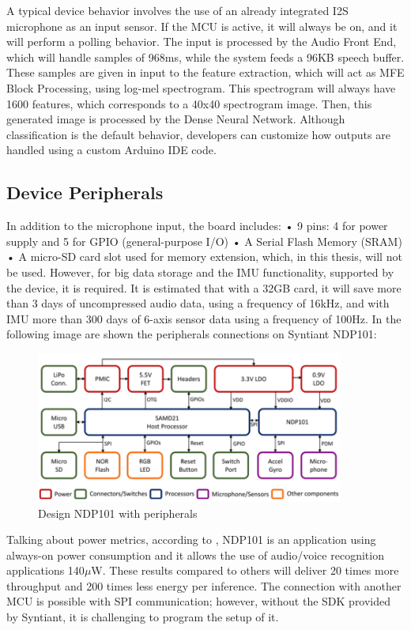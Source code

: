\newline A typical device behavior involves the use of an already integrated I2S microphone as an input sensor. If the MCU is active, it will always be on, and it will perform a polling behavior. The input is processed by the Audio Front End, which will handle samples of 968ms, while the system feeds a 96KB speech buffer. These samples are given in input to the feature extraction, which will act as MFE Block Processing\cite{syntiant_audio_block}, using log-mel spectrogram. This spectrogram will always have 1600 features, which corresponds to a 40x40 spectrogram image. Then, this generated image is processed by the Dense Neural Network. Although classification is the default behavior, developers can customize how outputs are handled using a custom Arduino IDE code.
\subsection{Device Peripherals}
In addition to the microphone input, the board includes:\newline
• 9 pins: 4 for power supply and 5 for GPIO (general-purpose I/O)\newline
• A Serial Flash Memory (SRAM)\newline
• A micro-SD card slot used for memory extension, which, in this thesis, will not be used. However, for big data storage and the IMU functionality, supported by the device, it is required. It is estimated that with a 32GB card, it will save more than 3 days of uncompressed audio data, using a frequency of 16kHz, and with IMU more than 300 days of 6-axis sensor data using a frequency of 100Hz.\newline
In the following image are shown the peripherals connections on Syntiant NDP101:
\begin{figure}[!h]
    \centering
        \includegraphics[width=0.9\textwidth]{images/2.02 Design with peripherals.png}
        \caption{Design NDP101 with peripherals}
\end{figure}
\newline Talking about power metrics, according to \cite{analysis_syntiant_performances}, NDP101 is an application using always-on power consumption and it allows the use of audio/voice recognition applications 140$\mu$W. These results compared to others will deliver 20 times more throughput and 200 times less energy per inference. The connection with another MCU is possible with SPI communication; however, without the SDK provided by Syntiant, it is challenging to program the setup of it.
